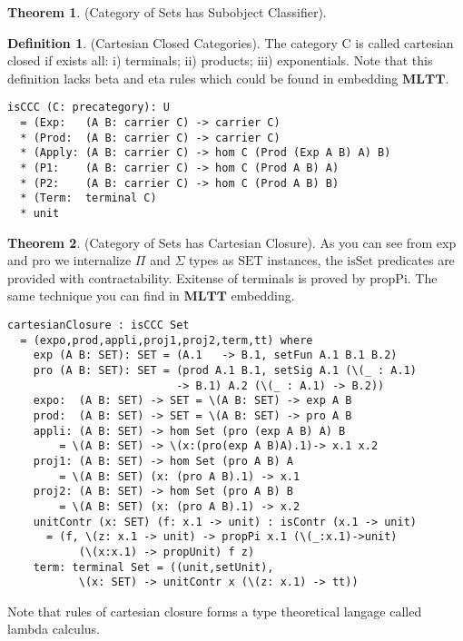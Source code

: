 \documentclass{article}
\theoremstyle{definition}
\newtheorem{definition}{Definition}
\newtheorem{theorem}{Theorem}
\begin{document}
\begin{theorem} (Category of Sets has Subobject Classifier).
\end{theorem}

\begin{definition} (Cartesian Closed Categories).
The category $\mathrm{C}$ is called cartesian closed if exists all:
i) terminals; ii) products; iii) exponentials. Note that this definition
lacks beta and eta rules which could be found in embedding $\mathbf{MLTT}$.
\begin{lstlisting}
isCCC (C: precategory): U
  = (Exp:   (A B: carrier C) -> carrier C)
  * (Prod:  (A B: carrier C) -> carrier C)
  * (Apply: (A B: carrier C) -> hom C (Prod (Exp A B) A) B)
  * (P1:    (A B: carrier C) -> hom C (Prod A B) A)
  * (P2:    (A B: carrier C) -> hom C (Prod A B) B)
  * (Term:  terminal C)
  * unit
\end{lstlisting}
\end{definition}

\begin{theorem} (Category of Sets has Cartesian Closure).
As you can see from exp and pro we internalize $\Pi$ and $\Sigma$ types as $\mathrm{SET}$ instances,
the $\mathrm{isSet}$ predicates are provided with contractability.
Exitense of terminals is proved by $\mathrm{propPi}$. The same technique you
can find in $\mathbf{MLTT}$ embedding.
\begin{lstlisting}
cartesianClosure : isCCC Set
  = (expo,prod,appli,proj1,proj2,term,tt) where
    exp (A B: SET): SET = (A.1   -> B.1, setFun A.1 B.1 B.2)
    pro (A B: SET): SET = (prod A.1 B.1, setSig A.1 (\(_ : A.1)
                          -> B.1) A.2 (\(_ : A.1) -> B.2))
    expo:  (A B: SET) -> SET = \(A B: SET) -> exp A B
    prod:  (A B: SET) -> SET = \(A B: SET) -> pro A B
    appli: (A B: SET) -> hom Set (pro (exp A B) A) B
        = \(A B: SET) -> \(x:(pro(exp A B)A).1)-> x.1 x.2
    proj1: (A B: SET) -> hom Set (pro A B) A
        = \(A B: SET) (x: (pro A B).1) -> x.1
    proj2: (A B: SET) -> hom Set (pro A B) B
        = \(A B: SET) (x: (pro A B).1) -> x.2
    unitContr (x: SET) (f: x.1 -> unit) : isContr (x.1 -> unit)
      = (f, \(z: x.1 -> unit) -> propPi x.1 (\(_:x.1)->unit)
           (\(x:x.1) -> propUnit) f z)
    term: terminal Set = ((unit,setUnit),
           \(x: SET) -> unitContr x (\(z: x.1) -> tt))
\end{lstlisting}
Note that rules of cartesian closure forms a type theoretical langage
called lambda calculus.
\end{theorem}
\end{document}
